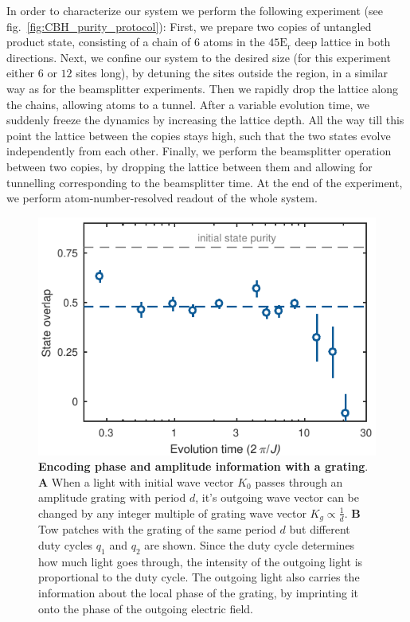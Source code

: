 

In order to characterize our system we perform the following experiment (see fig.~\ref{fig:CBH_purity_protocol}): First, we prepare two copies of untangled product state, consisting of a chain of $6$ atoms in the $45\mathrm{E_r}$ deep lattice in both directions. Next, we confine our system to the desired size (for this experiment either $6$ or $12$ sites long), by detuning the sites outside the region, in a similar way as for the beamsplitter experiments. Then we rapidly drop the lattice along the chains, allowing atoms to a tunnel. After a variable evolution time, we suddenly freeze the dynamics by increasing the lattice depth. All the way till this point the lattice between the copies stays high, such that the two states evolve independently from each other. Finally, we perform the beamsplitter operation between two copies, by dropping the lattice between them and allowing for tunnelling corresponding to the beamsplitter time. At the end of the experiment, we perform atom-number-resolved readout of the whole system.

\begin{figure}[t]
	\centering
	\includegraphics[scale=1]{figures/CBH_MBP_single_trace.pdf}
	\caption{{\bf Encoding phase and amplitude information with a grating}. {\bf A} When a light with initial wave vector $K_0$ passes through an amplitude grating with period $d$, it's outgoing wave vector can be changed by any integer multiple of grating wave vector $K_g\propto \frac{1}{d}$. {\bf B} Tow patches with the grating of the same period $d$ but different duty cycles $q_1$ and $q_2$ are shown. Since the duty cycle determines how much light goes through, the intensity of the outgoing light is proportional to the duty cycle. The outgoing light also carries the information about the local phase of the grating, by imprinting it onto the phase of the outgoing electric field.}
	\label{fig:CBH_MBP_vs_time}
\end{figure}

